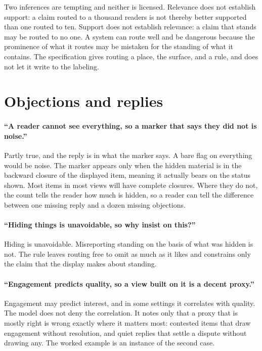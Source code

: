 \documentclass[11pt]{article}
\begin{document}
Two inferences are tempting and neither is licensed. Relevance does not establish support: a claim routed to a thousand readers is not thereby better supported than one routed to ten. Support does not establish relevance: a claim that stands may be routed to no one. A system can route well and be dangerous because the prominence of what it routes may be mistaken for the standing of what it contains. The specification gives routing a place, the surface, and a rule, and does not let it write to the labeling.

\section{Objections and replies}\label{sec:objections}

\paragraph{``A reader cannot see everything, so a marker that says they did not is noise.''} Partly true, and the reply is in what the marker says. A bare flag on everything would be noise. The marker appears only when the hidden material is in the backward closure of the displayed item, meaning it actually bears on the status shown. Most items in most views will have complete closures. Where they do not, the count tells the reader how much is hidden, so a reader can tell the difference between one missing reply and a dozen missing objections.

\paragraph{``Hiding things is unavoidable, so why insist on this?''} Hiding is unavoidable. Misreporting standing on the basis of what was hidden is not. The rule leaves routing free to omit as much as it likes and constrains only the claim that the display makes about standing.

\paragraph{``Engagement predicts quality, so a view built on it is a decent proxy.''} Engagement may predict interest, and in some settings it correlates with quality. The model does not deny the correlation. It notes only that a proxy that is mostly right is wrong exactly where it matters most: contested items that draw engagement without resolution, and quiet replies that settle a dispute without drawing any. The worked example is an instance of the second case.
\end{document}
